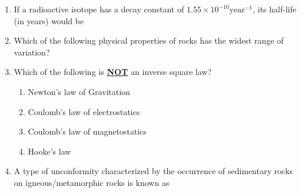 \documentclass[journal,12pt,onecolumn]{IEEEtran}
\theoremstyle{remark}
\begin{document}
\begin{enumerate}
        \item If a radioactive isotope has a decay constant of $1.55 \times 10^{-10}\text{year}^{-1}$, its half-life (in years) would be \hfill{}
            \begin{enumerate}
            \end{enumerate}

        \item Which of the following physical properties of rocks has the widest range of variation? \hfill{}
            \begin{enumerate}
            \end{enumerate}

        \item Which of the following is \underline{\textbf{NOT}} an inverse square law? \hfill{}
            \begin{enumerate}
                    \item Newton's law of Gravitation
                    \item Coulomb's law of electrostatics
                    \item Coulomb's law of magnetostatics
                    \item Hooke's law
            \end{enumerate}
        
        \item A type of unconformity characterized by the occurrence of sedimentary rocks on igneous/metamorphic rocks is known as \hfill{}
            \begin{enumerate}
            \end{enumerate}
        

\end{enumerate}
\end{document}
